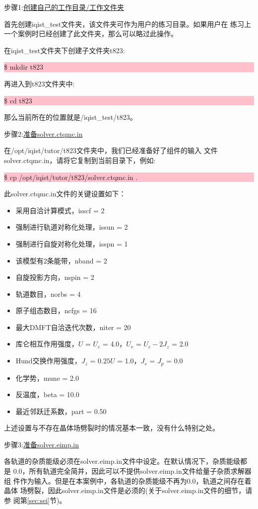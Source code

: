 步骤1:\underline{创建自己的工作目录/工作文件夹}

首先创建iqist\_test文件夹，该文件夹可作为用户的练习目录。如果用户在
练习上一个案例时已经创建了此文件夹，那么可以略过此操作。

在iqist\_test文件夹下创建子文件夹t823:

\noindent\colorbox{pink}{\parbox[r]{\linewidth}{\quad \$ mkdir t823 }}

再进入到t823文件夹中:

\noindent\colorbox{pink}{\parbox[r]{\linewidth}{\quad \$ cd t823 }}

那么当前所在的位置就是/iqist\_test/t823。

步骤2:\underline{准备solver.ctqmc.in}

在/opt/iqist/tutor/t823文件夹中，我们已经准备好了{\azalea}组件的输入
文件solver.ctqmc.in，请将它复制到当前目录下，例如:

\noindent\colorbox{pink}{\parbox[r]{\linewidth}{\quad \$ cp /opt/iqist/tutor/t823/solver.ctqmc.in . }}

此solver.ctqmc.in文件的关键设置如下：
\begin{itemize}
  \item 采用自洽计算模式，isscf = 2
  \item 强制进行轨道对称化处理，issun = 2
  \item 强制进行自旋对称化处理，isspn = 1
  \item 该模型有2条能带，nband = 2
  \item 自旋投影方向，nspin = 2
  \item 轨道数目，norbs = 4
  \item 原子组态数目，ncfgs = 16
  \item 最大DMFT自洽迭代次数，niter = 20
  \item 库仑相互作用强度，$U$ = $U_{c}$ = 4.0，$U_{v}$ = $U_{c}-2J_{z}$ = 2.0 
  \item Hund交换作用强度，$J_{z}$ = $0.25U$ = 1.0，$J_{s}$ = $J_{p}$ = 0.0
  \item 化学势，mune = 2.0
  \item 反温度，beta = 10.0
  \item 最近邻跃迁系数，part = 0.50
\end{itemize}
上述设置与不存在晶体场劈裂时的情况基本一致，没有什么特别之处。

步骤3:\underline{准备solver.eimp.in}

各轨道的杂质能级必须在solver.eimp.in文件中设定。在默认情况下，杂质能级都是
0.0，所有轨道完全简并，因此可以不提供solver.eimp.in文件给量子杂质求解器组
件作为输入。但是在本案例中，各轨道的杂质能级不再为0.0，轨道之间存在着晶体
场劈裂，因此solver.eimp.in文件是必须的(关于solver.eimp.in文件的细节，请参
阅第\ref{sec:sei}节)。

